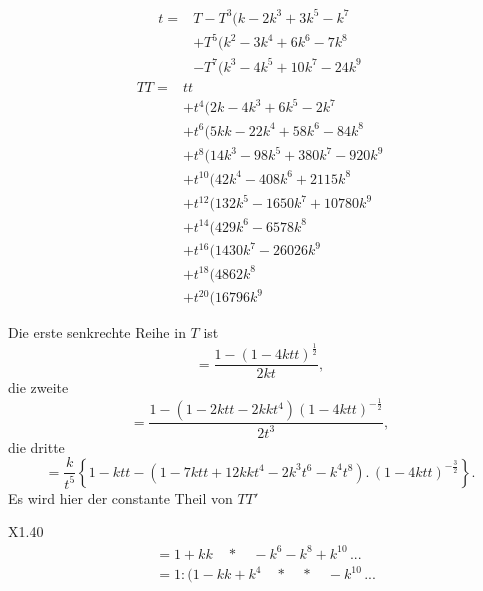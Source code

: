 \[\begin{aligned}
t={}&T-T^3(k-2k^3+3k^5-k^7\\
&+T^5(k^2-3k^4+6k^6-7k^8\\
&-T^7(k^3-4k^5+10k^7-24k^9
\end{aligned}\]
\[\begin{aligned}
TT={}&tt\\
&+t^4(2k-4k^3+6k^5-2k^7\\
&+t^6(5kk-22k^4+58k^6-84k^8\\
&+t^8(14k^3-98k^5+380k^7-920k^9\\
&+t^{10}(42k^4-408k^6+2115k^8\\
&+t^{12}(132k^5-1650k^7+10780k^9\\
&+t^{14}(429k^6-6578k^8\\
&+t^{16}(1430k^7-26026k^9\\
&+t^{18}(4862k^8\\
&+t^{20}(16796k^9
\end{aligned}\]
\noindent {\small[S. 177]}
\par\indent Die erste senkrechte Reihe in $T$ ist
\[=\frac{1-(1-4ktt)^{\frac12}}{2kt},\]
\noindent die zweite
\[=\frac{1-(1-2ktt-2kkt^4)(1-4ktt)^{-\frac12}}{2t^3},\]
\noindent die dritte
\[=\frac{k}{t^5}\left\{1-ktt-(1-7ktt+12kkt^4-2k^3t^6-k^4t^8).\,(1-4ktt)^{-\frac32}\right\}.\]
\noindent Es wird hier der constante Theil von $TT'$
\par\medskip\noindent X1.\hfill40
\clearpage{}
\[\begin{aligned}
&=1+kk\quad\ast\quad-k^6-k^8+k^{10}\,{.}{.}{.}\\
&=1:(1-kk+k^4\quad\ast\quad\ast\quad-k^{10}\,{.}{.}{.}
\end{aligned}\]
\clearpage
\endgroup
